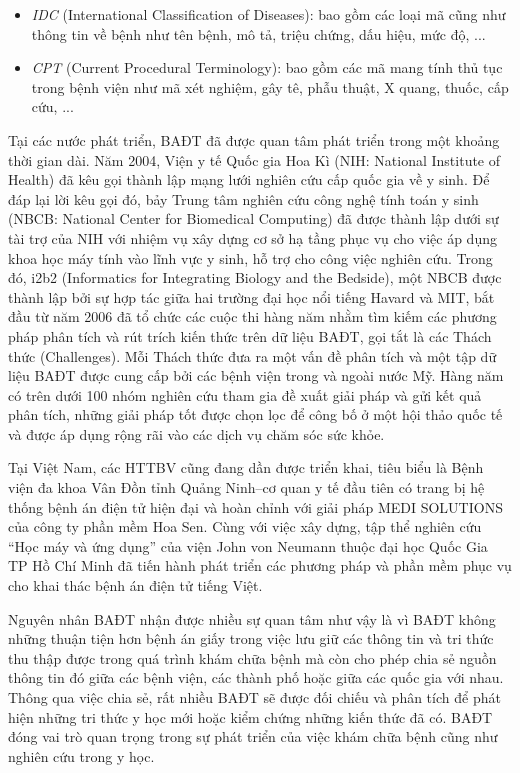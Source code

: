 \begin{itemize}[noitemsep]
\item \emph{IDC} (International Classification of Diseases): bao gồm các loại mã cũng như thông tin về bệnh như tên bệnh, mô tả, triệu chứng, dấu hiệu, mức độ, ...
\item \textit{CPT} (Current Procedural Terminology): bao gồm các mã mang tính thủ tục trong bệnh viện như mã xét nghiệm, gây tê, phẫu thuật, X quang, thuốc, cấp cứu, ...
\end{itemize}

Tại các nước phát triển, BAĐT đã được quan tâm phát triển trong một khoảng thời gian dài. Năm 2004, Viện y tế Quốc gia Hoa Kì (NIH: National Institute of Health) đã kêu gọi thành lập mạng lưới nghiên cứu cấp quốc gia về y sinh. Để đáp lại lời kêu gọi đó, bảy Trung tâm nghiên cứu công nghệ tính toán y sinh (NBCB: National Center for Biomedical Computing) đã được thành lập dưới sự tài trợ của NIH với nhiệm vụ xây dựng cơ sở hạ tầng phục vụ cho việc áp dụng khoa học máy tính vào lĩnh vực y sinh, hỗ trợ cho công việc nghiên cứu. Trong đó, i2b2 (Informatics for Integrating Biology and the Bedside), một NBCB được thành lập bởi sự hợp tác giữa hai trường đại học nổi tiếng Havard và MIT, bắt đầu từ năm 2006 đã tổ chức các cuộc thi hàng năm nhằm tìm kiếm các phương pháp phân tích và rút trích kiến thức trên dữ liệu BAĐT, gọi tắt là các Thách thức (Challenges). Mỗi Thách thức đưa ra một vấn đề phân tích và một tập dữ liệu BAĐT được cung cấp bởi các bệnh viện trong và ngoài nước Mỹ. Hàng năm có trên dưới 100 nhóm nghiên cứu tham gia đề xuất giải pháp và gửi kết quả phân tích, những giải pháp tốt được chọn lọc để công bố ở một hội thảo quốc tế và được áp dụng rộng rãi vào các dịch vụ chăm sóc sức khỏe.

Tại Việt Nam, các HTTBV cũng đang dần được triển khai, tiêu biểu là Bệnh viện đa khoa Vân Đồn tỉnh Quảng Ninh--cơ quan y tế đầu tiên có trang bị hệ thống bệnh án điện tử hiện đại và hoàn chỉnh với giải pháp MEDI SOLUTIONS của công ty phần mềm Hoa Sen. Cùng với việc xây dựng, tập thể nghiên cứu ``Học máy và ứng dụng'' của viện John von Neumann thuộc đại học Quốc Gia TP Hồ Chí Minh đã tiến hành phát triển các phương pháp và phần mềm phục vụ cho khai thác bệnh án điện tử tiếng Việt.

Nguyên nhân BAĐT nhận được nhiều sự quan tâm như vậy là vì BAĐT không những thuận tiện hơn bệnh án giấy trong việc lưu giữ các thông tin và tri thức thu thập được trong quá trình khám chữa bệnh mà còn cho phép chia sẻ nguồn thông tin đó giữa các bệnh viện, các thành phố hoặc giữa các quốc gia với nhau. Thông qua việc chia sẻ, rất nhiều BAĐT sẽ được đối chiếu và phân tích để phát hiện những tri thức y học mới hoặc kiểm chứng những kiến thức đã có. BAĐT đóng vai trò quan trọng trong sự phát triển của việc khám chữa bệnh cũng như nghiên cứu trong y học.

